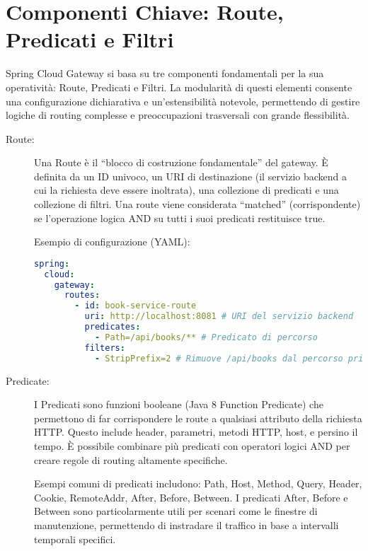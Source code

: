 \section{Componenti Chiave: Route, Predicati e Filtri}

Spring Cloud Gateway si basa su tre componenti fondamentali per la sua operatività: Route, Predicati e Filtri. La modularità di questi elementi consente una configurazione dichiarativa e un'estensibilità notevole, permettendo di gestire logiche di routing complesse e preoccupazioni trasversali con grande flessibilità.
\begin{description}
    \item[Route:] Una Route è il \enquote{blocco di costruzione fondamentale} del gateway. È definita da un ID univoco, un URI di destinazione (il servizio backend a cui la richiesta deve essere inoltrata), una collezione di predicati e una collezione di filtri. Una route viene considerata \enquote{matched} (corrispondente) se l'operazione logica AND su tutti i suoi predicati restituisce true.

    Esempio di configurazione (YAML):
    \begin{lstlisting}[language=yaml, caption=Esempio di configurazione di una route in YAML]
spring:
  cloud:
    gateway:
      routes:
        - id: book-service-route
          uri: http://localhost:8081 # URI del servizio backend
          predicates:
            - Path=/api/books/** # Predicato di percorso
          filters:
            - StripPrefix=2 # Rimuove /api/books dal percorso prima di inoltrare
    \end{lstlisting}

    \item[Predicate:] I Predicati sono funzioni booleane (Java 8 Function Predicate) che permettono di far corrispondere le route a qualsiasi attributo della richiesta HTTP. Questo include header, parametri, metodi HTTP, host, e persino il tempo. È possibile combinare più predicati con operatori logici AND per creare regole di routing altamente specifiche.

    Esempi comuni di predicati includono: Path, Host, Method, Query, Header, Cookie, RemoteAddr, After, Before, Between. I predicati After, Before e Between sono particolarmente utili per scenari come le finestre di manutenzione, permettendo di instradare il traffico in base a intervalli temporali specifici.


\end{description}
